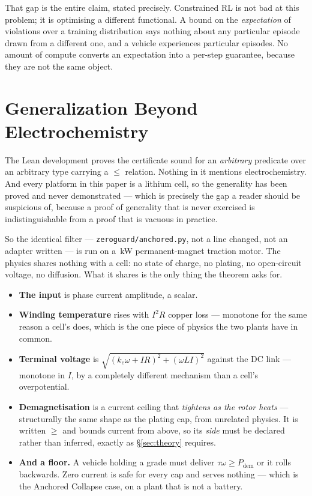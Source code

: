 \documentclass[11pt,letterpaper]{article}
\theoremstyle{definition}
\theoremstyle{remark}
\begin{document}
That gap is the entire claim, stated precisely. Constrained RL is not bad at this problem; it is
optimising a different functional. A bound on the \emph{expectation} of violations over a
training distribution says nothing about any particular episode drawn from a different one, and
a vehicle experiences particular episodes. No amount of compute converts an expectation into a
per-step guarantee, because they are not the same object.





\section{Generalization Beyond Electrochemistry}\label{sec:motor}

The Lean development proves the certificate sound for an \emph{arbitrary} predicate over an
arbitrary type carrying a $\le$ relation. Nothing in it mentions electrochemistry. And every
platform in this paper is a lithium cell, so the generality has been proved and never
demonstrated --- which is precisely the gap a reader should be suspicious of, because a proof
of generality that is never exercised is indistinguishable from a proof that is vacuous in
practice.

So the identical filter --- \texttt{zeroguard/anchored.py}, not a line changed, not an adapter
written --- is run on a \mtPower\,kW permanent-magnet traction motor. The physics shares nothing
with a cell: no state of charge, no plating, no open-circuit voltage, no diffusion. What it
shares is the only thing the theorem asks for.

\begin{itemize}\itemsep1pt
\item \textbf{The input} is phase current amplitude, a scalar.
\item \textbf{Winding temperature} rises with $I^2R$ copper loss --- monotone for the same
reason a cell's does, which is the one piece of physics the two plants have in common.
\item \textbf{Terminal voltage} is $\sqrt{(k_e\omega + IR)^2 + (\omega L I)^2}$ against the DC
link --- monotone in $I$, by a completely different mechanism than a cell's overpotential.
\item \textbf{Demagnetisation} is a current ceiling that \emph{tightens as the rotor heats} ---
structurally the same shape as the plating cap, from unrelated physics. It is written $\ge$ and
bounds current from above, so its \emph{side} must be declared rather than inferred, exactly as
\S\ref{sec:theory} requires.
\item \textbf{And a floor.} A vehicle holding a grade must deliver $\tau\omega \ge P_{\mathrm{dem}}$
or it rolls backwards. Zero current is safe for every cap and serves nothing --- which is the
Anchored Collapse case, on a plant that is not a battery.
\end{itemize}
\end{document}
